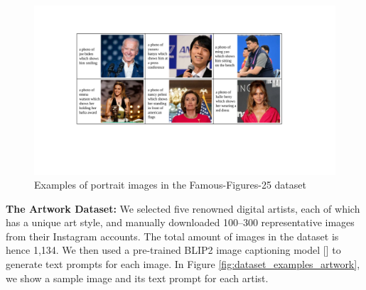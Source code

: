 \documentclass{article}
\begin{document}
\begin{figure}[h]
	\centering
	\vspace{-0.05in}
	\includegraphics[width=0.9\linewidth]{figures/dataset_examples.pdf}
	\caption{Examples of portrait images in the Famous-Figures-25 dataset}
	\label{fig:dataset_examples}
\end{figure}

\vspace{0.1in}
\noindent\textbf{The Artwork Dataset:} We selected five renowned digital artists, each of which has a unique art style, and manually downloaded 100–300 representative images from their Instagram accounts. The total amount of images in the dataset is hence 1,134. We then used a pre-trained BLIP2 image captioning model [] to generate text prompts for each image. In Figure \ref{fig:dataset_examples_artwork}, we show a sample image and its text prompt for each artist.
\end{document}
